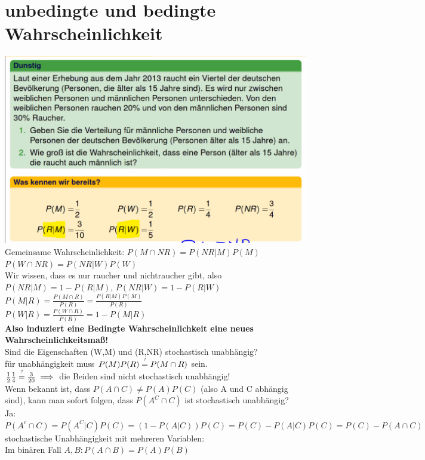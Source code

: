 \documentclass{article}
\newcommand\stackequal[2]{%
  \mathrel{\stackunder[2pt]{\stackon[4pt]{=}{$\scriptscriptstyle#1$}}{%
  $\scriptscriptstyle#2$}}
 }
\begin{document}
	\section{unbedingte und bedingte Wahrscheinlichkeit}
	\includegraphics[scale=0.25]{Raucher Stat.png}\\
	Gemeinsame Wahrscheinlichkeit: $P(M\cap NR) = P(NR|M)P(M)$\\
	$P(W\cap NR) = P(NR|W)P(W)$\\
	Wir wissen, dass es nur raucher und nichtraucher gibt, also $P(NR|M) = 1-P(R|M)$, $P(NR|W) = 1-P(R|W)$\\
	$P(M|R) = \frac{P(M\cap R)}{P(R)} =\frac{P(R|M)P(M)}{P(R)}$\\
	$P(W|R) = \frac{P(W\cap R)}{P(R)} = 1-P(M|R)$\\
	\textbf{Also induziert eine Bedingte Wahrscheinlichkeit eine neues Wahrscheinlichkeitsmaß!}\\
	Sind die Eigenschaften (W,M) und (R,NR) stochastisch unabhängig?\\
	für unabhängigkeit muss $P(M)P(R) \stackequal{?}{} P(M\cap R)$ sein.\\
	$\frac{1}{2}\frac{1}{4}\stackequal{?}{} \frac{3}{20}\implies $ die Beiden sind nicht stochastisch unabhängig!\\
	Wenn bekannt ist, dass $P(A\cap C)\neq P(A)P(C)$ (also A und C abhängig sind), kann man sofort folgen, dass $P(A^C\cap C)$ ist stochastisch unabhängig?\\
	Ja: $P(A^c\cap C)= P(A^C|C)P(C)= (1-P(A|C))P(C) = P(C)-P(A|C)P(C) = P(C)-P(A\cap C)$\\
	stochastische Unabhängigkeit mit mehreren Variablen:\\
	Im binären Fall $A,B: P(A\cap B)=P(A)P(B)$\\
\end{document}
